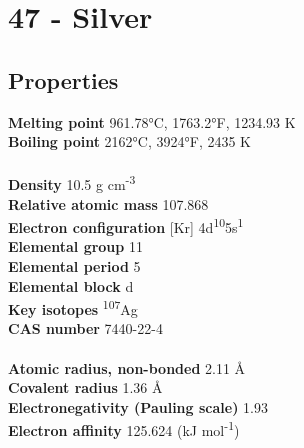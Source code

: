\section{47 - Silver}
\label{sec:elem-silver}
\subsection{Properties}
\textbf{Melting point} 961.78°C, 1763.2°F, 1234.93 K\\
\textbf{Boiling point} 2162°C, 3924°F, 2435 K\\
\\
\textbf{Density} 10.5 g cm\textsuperscript{-3}\\
\textbf{Relative atomic mass} 107.868\\
\textbf{Electron configuration} [Kr] 4d\textsuperscript{10}5s\textsuperscript{1}\\
\textbf{Elemental group} 11\\
\textbf{Elemental period} 5\\
\textbf{Elemental block} d\\
\textbf{Key isotopes} \textsuperscript{107}Ag\\
\textbf{CAS number} 7440-22-4\\
\\
\textbf{Atomic radius, non-bonded} 2.11 Å\\
\textbf{Covalent radius} 1.36 Å\\
\textbf{Electronegativity (Pauling scale)} 1.93\\
\textbf{Electron affinity} 125.624 (kJ mol\textsuperscript{-1})\\